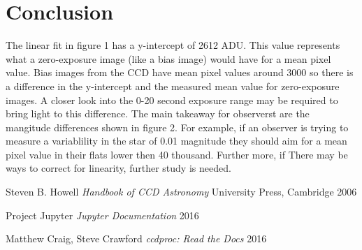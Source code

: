 \documentclass{article}
\begin{document}
\section{Conclusion}
The linear fit in figure 1 has a y-intercept of 2612 ADU. This value represents what a zero-exposure image (like a bias image) would have for a mean pixel value. Bias images from the CCD have mean pixel values around 3000 so there is a difference in the y-intercept and the measured mean value for zero-exposure images. A closer look into the 0-20 second exposure range may be required to bring light to this difference.
The main takeaway for observerst are the mangitude differences shown in figure 2. For example, if an observer is trying to measure a variablility in the star of 0.01 magnitude they should aim for a mean pixel value in their flats lower then 40 thousand. Further more, if  There may be ways to correct for linearity, further study is needed.

\begin{thebibliography}{9}

	Steven B. Howell
	\emph{Handbook of CCD Astronomy}
	University Press, Cambridge
	2006

	Project Jupyter
	\emph{Jupyter Documentation}
	2016

	Matthew Craig, Steve Crawford
	\emph{ccdproc: Read the Docs}
	2016

\end{thebibliography}
\end{document}
